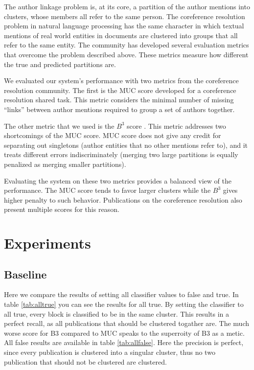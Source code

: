 \documentclass[twocolumn,letterpaper]{article}
\begin{document}
The author linkage problem is, at its core, a partition of the author
mentions into clusters, whose members all refer to the same person.
The coreference resolution problem in natural language processing has
the same character in which textual mentions of real world entities in
documents are clustered into groups that all refer to the same entity.
The community has developed several evaluation metrics that overcome
the problem described above.  These metrics measure how different the
true and predicted partitions are.

We evaluated our system's performance with two metrics from the
coreference resolution community.  The first is the MUC score
\cite{Vilain95} developed for a coreference resolution shared task.
This metric considers the minimal number of missing ``links'' between
author mentions required to group a set of authors together.

The other metric that we used is the $B^3$ score \cite{Bagga98b}.
This metric addresses two shortcomings of the MUC score.  MUC score
does not give any credit for separating out singletons (author
entities that no other mentions refer to), and it treats different
errors indiscriminately (merging two large partitions is equally
penalized as merging smaller partitions).

Evaluating the system on these two metrics provides a balanced view of
the performance.  The MUC score tends to favor larger clusters while
the $B^3$ gives higher penalty to such behavior.  Publications on the
coreference resolution also present multiple scores for this reason.

\section{Experiments} %
\label{sec:experiments}
\subsection{Baseline} %
\label{sub:baseline}
Here we compare the results of setting all classifier values to false and true. In table \ref{tab:alltrue} you can see the results for all true. By setting the classifier to all true, every block is classified to be in the same cluster. This results in a perfect recall, as all publications that should be clustered togather are. The much worse score for B3 compared to MUC speaks to the superroity of B3 as a metic. All false results are available in table \ref{tab:allfalse}. Here the precision is perfect, since every publication is clustered into a singular cluster, thus no two publication that should not be clustered are clustered.
\end{document}
